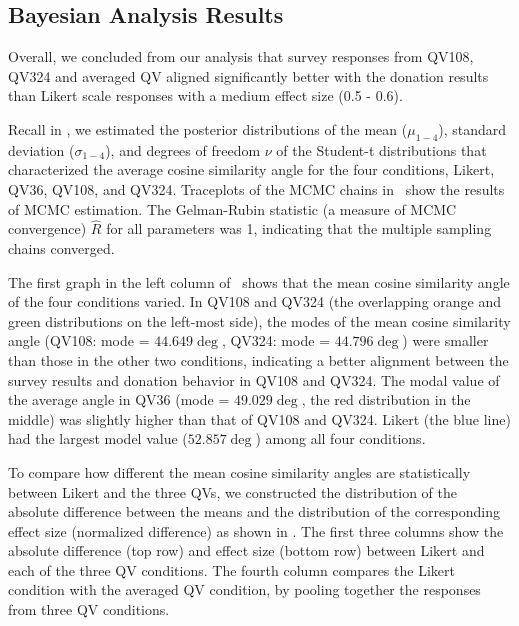 \subsection{Bayesian Analysis Results}
Overall, we concluded from our analysis that survey responses from QV108, QV324 and averaged QV aligned significantly better with the donation results than Likert scale responses with a medium effect size (0.5 - 0.6). 

Recall in , we estimated the posterior distributions of the mean ($\mu_{1-4}$), standard deviation ($\sigma_{1-4}$), and degrees of freedom $\nu$ of the Student-t distributions that characterized the average cosine similarity angle for the four conditions, Likert, QV36, QV108, and QV324. Traceplots of the MCMC chains in~ show the results of MCMC estimation. The Gelman-Rubin statistic (a measure of MCMC convergence) $\hat{R}$ for all parameters was 1, indicating that the multiple sampling chains converged. 

The first graph in the left column of~ shows that the mean cosine similarity angle of the four conditions varied. In QV108 and QV324 (the overlapping orange and green distributions on the left-most side), the modes of the mean cosine similarity angle (QV108: mode = $44.649 \deg$, QV324: mode = $44.796 \deg$) were smaller than those in the other two conditions, indicating a better alignment between the survey results and donation behavior in QV108 and QV324. The modal value of the average angle in QV36 (mode = $49.029 \deg$, the red distribution in the middle) was slightly higher than that of QV108 and QV324. Likert (the blue line) had the largest model value ($52.857 \deg$) among all four conditions. 

To compare how different the mean cosine similarity angles are statistically between Likert and the three QVs, we constructed the distribution of the absolute difference between the means and the distribution of the corresponding effect size (normalized difference) as shown in . The first three columns show the absolute difference (top row) and effect size (bottom row) between Likert and each of the three QV conditions. The fourth column compares the Likert condition with the averaged QV condition, by pooling together the responses from three QV conditions. 

